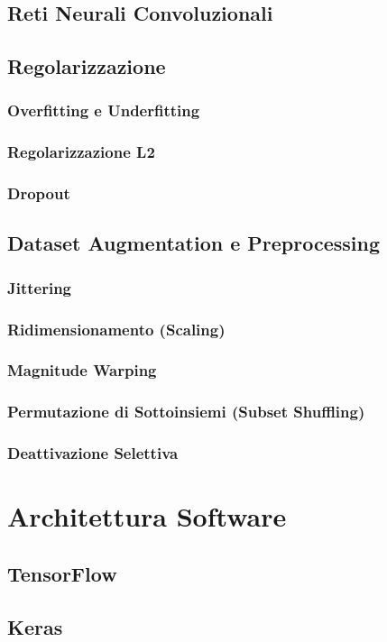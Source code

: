 \documentclass[12pt]{report}
\begin{document}
\section{Reti Neurali Convoluzionali}
\section{Regolarizzazione}
\subsection{Overfitting e Underfitting}
\subsection{Regolarizzazione L2}
\subsection{Dropout}
\section{Dataset Augmentation e Preprocessing}
\subsection{Jittering}
\subsection{Ridimensionamento (Scaling)}
\subsection{Magnitude Warping}
\subsection{Permutazione di Sottoinsiemi (Subset Shuffling)}
\subsection{Deattivazione Selettiva}


\chapter{Architettura Software}
\section{TensorFlow}
\section{Keras}
\end{document}
